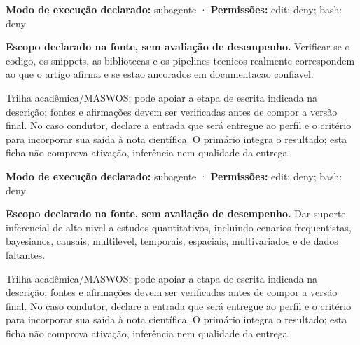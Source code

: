 \begin{arquitetura}
\textbf{Modo de execução declarado:} subagente · \textbf{Permissões:} edit: deny; bash: deny
\end{arquitetura}


\begin{descricao}
\textbf{Escopo declarado na fonte, sem avaliação de desempenho.}
Verificar se o codigo, os snippets, as bibliotecas e os pipelines tecnicos realmente correspondem ao que o artigo afirma e se estao ancorados em documentacao confiavel.
\end{descricao}

\begin{funcao}
Trilha acadêmica/MASWOS: pode apoiar a etapa de escrita indicada na descrição; fontes e afirmações devem ser verificadas antes de compor a versão final. No caso condutor, declare a entrada que será entregue ao perfil e o critério para incorporar sua saída à nota científica. O primário integra o resultado; esta ficha não comprova ativação, inferência nem qualidade da entrega.
\end{funcao}

\begin{arquitetura}
\textbf{Modo de execução declarado:} subagente · \textbf{Permissões:} edit: deny; bash: deny
\end{arquitetura}


\begin{descricao}
\textbf{Escopo declarado na fonte, sem avaliação de desempenho.}
Dar suporte inferencial de alto nivel a estudos quantitativos, incluindo cenarios frequentistas, bayesianos, causais, multilevel, temporais, espaciais, multivariados e de dados faltantes.
\end{descricao}

\begin{funcao}
Trilha acadêmica/MASWOS: pode apoiar a etapa de escrita indicada na descrição; fontes e afirmações devem ser verificadas antes de compor a versão final. No caso condutor, declare a entrada que será entregue ao perfil e o critério para incorporar sua saída à nota científica. O primário integra o resultado; esta ficha não comprova ativação, inferência nem qualidade da entrega.
\end{funcao}

